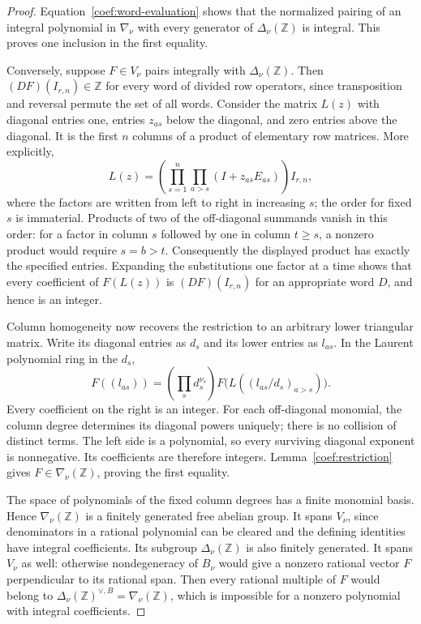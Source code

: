 \begin{proof}
Equation~\eqref{coef:word-evaluation} shows that the normalized pairing
of an integral polynomial in $\nabla_\nu$ with every generator of
$\Delta_\nu(\mathbb Z)$ is integral. This proves one inclusion in
the first equality.

Conversely, suppose $F\in V_\nu$ pairs integrally with
$\Delta_\nu(\mathbb Z)$. Then $(DF)(I_{r,n})\in\mathbb Z$ for
every word of divided row operators, since transposition and reversal
permute the set of all words. Consider the matrix $L(z)$ with diagonal
entries one, entries $z_{as}$ below the diagonal, and zero entries
above the diagonal. It is the first $n$ columns of a product of
elementary row matrices. More explicitly,
\[
 L(z)=\left(\prod_{s=1}^n\prod_{a>s}(I+z_{as}E_{as})\right)I_{r,n},
\]
where the factors are written from left to right in increasing $s$;
the order for fixed $s$ is immaterial. Products of two of the
off-diagonal summands vanish in this order: for a factor in column
$s$ followed by one in column $t\ge s$, a nonzero product would
require $s=b>t$. Consequently the displayed product has exactly the
specified entries. Expanding the substitutions one factor at a time
shows that every coefficient of $F(L(z))$ is $(DF)(I_{r,n})$ for an
appropriate word $D$, and hence is an integer.

Column homogeneity now recovers the restriction to an arbitrary lower
triangular matrix. Write its diagonal entries as $d_s$ and its lower
entries as $l_{as}$. In the Laurent polynomial ring in the $d_s$,
\[
 F((l_{as}))=\left(\prod_s d_s^{\nu_s}\right)
              F\bigl(L((l_{as}/d_s)_{a>s})\bigr).
\]
Every coefficient on the right is an integer. For each off-diagonal
monomial, the column degree determines its diagonal powers uniquely;
there is no collision of distinct terms. The left side is a polynomial,
so every surviving diagonal exponent is nonnegative. Its coefficients
are therefore integers. Lemma~\ref{coef:restriction} gives
$F\in\nabla_\nu(\mathbb Z)$, proving the first equality.

The space of polynomials of the fixed column degrees has a finite
monomial basis. Hence $\nabla_\nu(\mathbb Z)$ is a finitely generated
free abelian group. It spans $V_\nu$, since denominators in a rational
polynomial can be cleared and the defining identities have integral
coefficients. Its subgroup $\Delta_\nu(\mathbb Z)$ is also finitely
generated. It spans $V_\nu$ as well: otherwise nondegeneracy of $B_\nu$
would give a nonzero rational vector $F$ perpendicular to its rational
span. Then every rational multiple of $F$ would belong to
$\Delta_\nu(\mathbb Z)^{\vee,B}=\nabla_\nu(\mathbb Z)$, which is
impossible for a nonzero polynomial with integral coefficients.


\end{proof}
